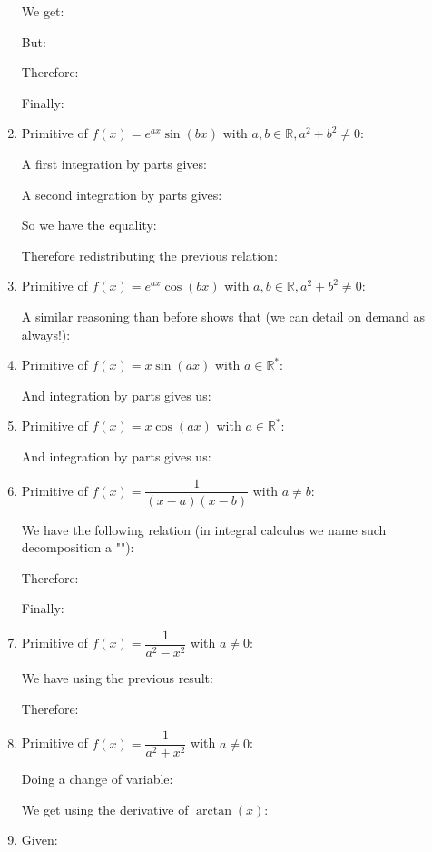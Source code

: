 \begin{enumerate}
		We get:
		
		But:
		
		Therefore:
		
		Finally:
		
		
		\item Primitive of $f(x)=e^{ax}\sin(bx)$ with $a,b\in \mathbb{R},a^2+b^2\neq 0$:
		
		A first integration by parts gives:
		
		A second integration by parts gives:
		
		So we have the equality:
		
		Therefore redistributing the previous relation:
		
		
		\item Primitive of $f(x)=e^{ax}\cos(bx)$ with $a,b\in \mathbb{R},a^2+b^2\neq 0$:
		
		A similar reasoning than before shows that (we can detail on demand as always!):
		
		
		\item Primitive of $f(x)=x\sin(ax)$ with $a \in \mathbb{R}^*$:
		
		And integration by parts gives us:
		
		
		\item Primitive of $f(x)=x\cos(ax)$ with $a \in \mathbb{R}^*$:
		
		And integration by parts gives us:
		
		
		\item Primitive of $f(x)=\dfrac{1}{(x-a)(x-b)}$ with $a \neq b$:
		
		We have the following relation (in integral calculus we name such decomposition a ""):
		
		Therefore:
		
		
		Finally:
		
		
		\item Primitive of $f(x)=\dfrac{1}{a^2-x^2}$ with $a \neq 0$:
		
		We have using the previous result:	
		
		Therefore:
		

		\item Primitive of $f(x)=\dfrac{1}{a^2+x^2}$ with $a \neq 0$:
		
		Doing a change of variable:
		
		We get using the derivative of $\arctan (x)$:
		
		
		\item Given:
		

\end{enumerate}
